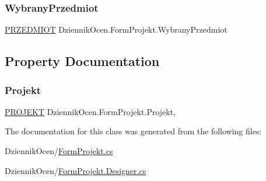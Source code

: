 \subsubsection{\texorpdfstring{Wybrany\+Przedmiot}{WybranyPrzedmiot}}
{\footnotesize\ttfamily \hyperlink{class_dziennik_ocen_1_1_p_r_z_e_d_m_i_o_t}{P\+R\+Z\+E\+D\+M\+I\+OT} Dziennik\+Ocen.\+Form\+Projekt.\+Wybrany\+Przedmiot\hspace{0.3cm}{\ttfamily [private]}}



\subsection{Property Documentation}
\mbox{\label{class_dziennik_ocen_1_1_form_projekt_a3fa55e05e8e5a170bb01eb7a0682a342}} 
\subsubsection{\texorpdfstring{Projekt}{Projekt}}
{\footnotesize\ttfamily \hyperlink{class_dziennik_ocen_1_1_p_r_o_j_e_k_t}{P\+R\+O\+J\+E\+KT} Dziennik\+Ocen.\+Form\+Projekt.\+Projekt\hspace{0.3cm}{\ttfamily [get]}, {\ttfamily [set]}}



The documentation for this class was generated from the following files\+:\begin{DoxyCompactItemize}
\item 
Dziennik\+Ocen/\hyperlink{_form_projekt_8cs}{Form\+Projekt.\+cs}\item 
Dziennik\+Ocen/\hyperlink{_form_projekt_8_designer_8cs}{Form\+Projekt.\+Designer.\+cs}\end{DoxyCompactItemize}
